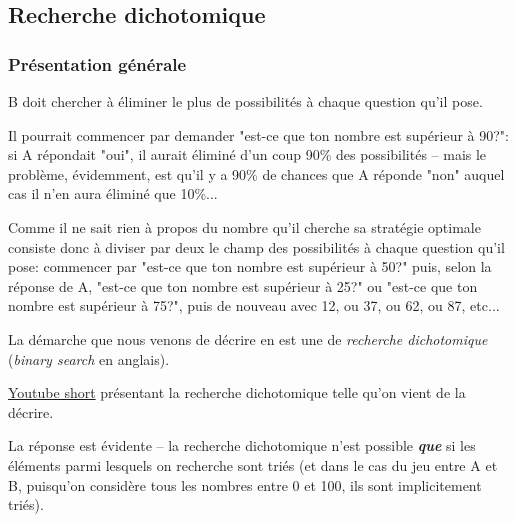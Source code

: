 \documentclass[12pt]{article}
\begin{document}
	\subsection{Recherche dichotomique}
	\subsubsection*{Présentation générale}

	\begin{MaReponse}
		B doit chercher à éliminer le plus de possibilités à chaque question qu'il pose.
		
		Il pourrait commencer par demander "est-ce que ton nombre est supérieur à 90?": si A répondait "oui", il aurait éliminé d'un coup 90\% des possibilités -- mais le problème, évidemment, est qu'il y a 90\% de chances que A réponde "non" auquel cas il n'en aura éliminé que 10\%...
		
		Comme il ne sait rien à propos du nombre qu'il cherche sa stratégie optimale consiste donc à diviser par deux le champ des possibilités à chaque question qu'il pose: commencer par "est-ce que ton nombre est supérieur à 50?" puis, selon la réponse de A, "est-ce que ton nombre est supérieur à 25?" ou "est-ce que ton nombre est supérieur à 75?", puis de nouveau avec 12, ou 37, ou 62, ou 87, etc...
	\end{MaReponse}
	
	La démarche que nous venons de décrire en est une de \textit{recherche dichotomique} (\textit{binary search} en anglais).
	
	\begin{MaVid}
		\href{https://youtu.be/c-PMOD2O7E4}{Youtube short} présentant la recherche dichotomique telle qu'on vient de la décrire.
	\end{MaVid}
		
	\begin{MaReponse}
		La réponse est évidente -- la recherche dichotomique n'est possible \textbf{\textit{que}} si les éléments parmi lesquels on recherche sont triés (et dans le cas du jeu entre A et B, puisqu'on considère tous les nombres entre 0 et 100, ils sont implicitement triés).
	\end{MaReponse}
\end{document}
